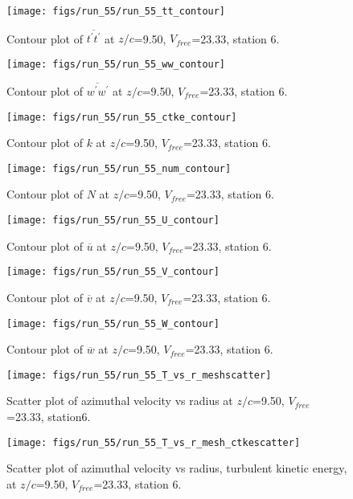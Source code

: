 \begin{figure}[H]
\centering
\texttt{[image: figs/run\_55/run\_55\_tt\_contour]}
\caption{Contour plot of $\overline{t^\prime t^\prime}$ at $z/c$=9.50, $V_{free}$=23.33, station 6.}
\end{figure}


\begin{figure}[H]
\centering
\texttt{[image: figs/run\_55/run\_55\_ww\_contour]}
\caption{Contour plot of $\overline{w^\prime w^\prime}$ at $z/c$=9.50, $V_{free}$=23.33, station 6.}
\end{figure}


\begin{figure}[H]
\centering
\texttt{[image: figs/run\_55/run\_55\_ctke\_contour]}
\caption{Contour plot of $k$ at $z/c$=9.50, $V_{free}$=23.33, station 6.}
\end{figure}


\begin{figure}[H]
\centering
\texttt{[image: figs/run\_55/run\_55\_num\_contour]}
\caption{Contour plot of $N$ at $z/c$=9.50, $V_{free}$=23.33, station 6.}
\end{figure}


\begin{figure}[H]
\centering
\texttt{[image: figs/run\_55/run\_55\_U\_contour]}
\caption{Contour plot of $\overline{u}$ at $z/c$=9.50, $V_{free}$=23.33, station 6.}
\end{figure}


\begin{figure}[H]
\centering
\texttt{[image: figs/run\_55/run\_55\_V\_contour]}
\caption{Contour plot of $\overline{v}$ at $z/c$=9.50, $V_{free}$=23.33, station 6.}
\end{figure}


\begin{figure}[H]
\centering
\texttt{[image: figs/run\_55/run\_55\_W\_contour]}
\caption{Contour plot of $\overline{w}$ at $z/c$=9.50, $V_{free}$=23.33, station 6.}
\end{figure}


\begin{figure}[H]
\centering
\texttt{[image: figs/run\_55/run\_55\_T\_vs\_r\_meshscatter]}
\caption{Scatter plot of azimuthal velocity vs radius at $z/c$=9.50, $V_{free}$=23.33, station6.}
\end{figure}


\begin{figure}[H]
\centering
\texttt{[image: figs/run\_55/run\_55\_T\_vs\_r\_mesh\_ctkescatter]}
\caption{Scatter plot of azimuthal velocity vs radius, turbulent kinetic energy, at $z/c$=9.50, $V_{free}$=23.33, station 6.}
\end{figure}


